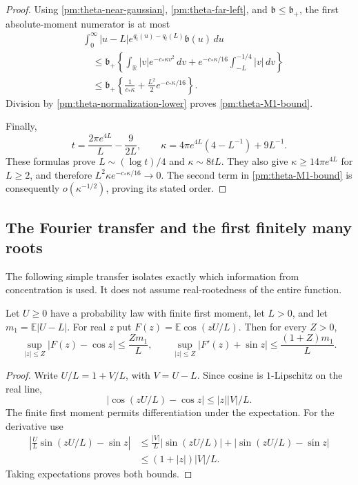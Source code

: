 \begin{proof}
Using \eqref{pm:theta-near-gaussian},
\eqref{pm:theta-far-left}, and \(\mathfrak b\le\mathfrak b_+\),
the first absolute-moment numerator is at most
\begin{align*}
 &\int_0^\infty |u-L|e^{q_t(u)-q_t(L)}\mathfrak b(u)\,du\\
 &\quad\le\mathfrak b_+
 \left\{\int_{\mathbb R}|v|e^{-c_*\kappa v^2}\,dv
        +e^{-c_*\kappa/16}\int_{-L}^{-1/4}|v|\,dv\right\}\\
 &\quad\le\mathfrak b_+
       \left\{\frac1{c_*\kappa}
                  +\frac{L^2}{2}e^{-c_*\kappa/16}\right\}.
\end{align*}
Division by \eqref{pm:theta-normalization-lower} proves
\eqref{pm:theta-M1-bound}.

Finally,
\[
 t=\frac{2\pi e^{4L}}L-\frac9{2L},\qquad
 \kappa=4\pi e^{4L}(4-L^{-1})+9L^{-1}.
\]
These formulas prove \(L\sim(\log t)/4\) and
\(\kappa\sim8tL\).  They also give
\(\kappa\ge14\pi e^{4L}\) for \(L\ge2\), and therefore
\(L^2\kappa e^{-c_*\kappa/16}\to0\).  The second term in
\eqref{pm:theta-M1-bound} is consequently
\(o(\kappa^{-1/2})\), proving its stated order.
\end{proof}

\subsection{The Fourier transfer and the first finitely many roots}
\label{pm:theta-fourier-subsection}

The following simple transfer isolates exactly which information from
concentration is used.  It does not assume real-rootedness of the entire
function.

\begin{lemma}
\label{pm:fourier-transfer}
Let \(U\ge0\) have a probability law with finite first moment, let
\(L>0\), and let \(m_1=\mathbb E|U-L|\).  For real \(z\) put
\(F(z)=\mathbb E\cos(zU/L)\).  Then for every \(Z>0\),
\begin{equation}
 \sup_{|z|\le Z}|F(z)-\cos z|\le\frac{Zm_1}{L},\qquad
 \sup_{|z|\le Z}|F'(z)+\sin z|\le\frac{(1+Z)m_1}{L}.
 \label{pm:fourier-C1-bounds}
\end{equation}
\end{lemma}

\begin{proof}
Write \(U/L=1+V/L\), with \(V=U-L\).  Since cosine is
\(1\)-Lipschitz on the real line,
\[
 |\cos(zU/L)-\cos z|\le |z||V|/L.
\]
The finite first moment permits differentiation under the expectation.
For the derivative use
\begin{align*}
 \left|\frac UL\sin(zU/L)-\sin z\right|
 &\le\frac{|V|}{L}|\sin(zU/L)|
           +|\sin(zU/L)-\sin z|\\
 &\le(1+|z|)|V|/L.
\end{align*}
Taking expectations proves both bounds.
\end{proof}

